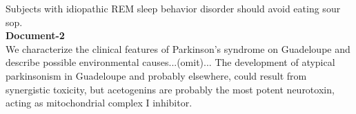 \documentclass[10pt, a4paper, logo]{googledeepmind} %
\begin{document}
\begin{tcolorbox}
\begin{flushleft}
Subjects with idiopathic REM sleep behavior disorder should avoid eating sour sop.
\\
\vspace{1em}
\textbf{Document-2}\\
We characterize the clinical features of Parkinson's syndrome on Guadeloupe and describe possible environmental causes...(omit)...
The development of atypical parkinsonism in Guadeloupe and probably elsewhere, could result from synergistic toxicity, but acetogenins are probably the most potent neurotoxin, acting as mitochondrial complex I inhibitor.

\end{flushleft}
\end{tcolorbox}
\end{document}
